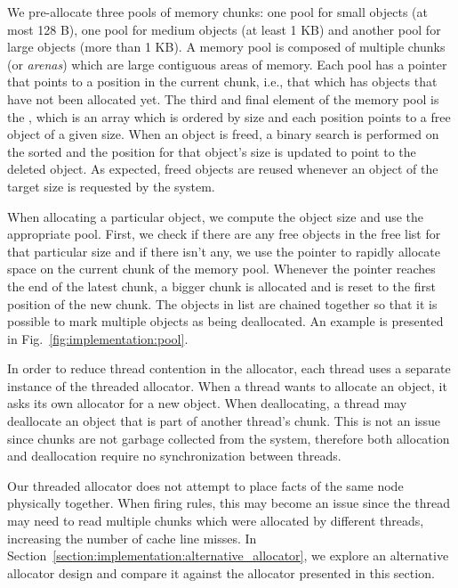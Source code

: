 We pre-allocate three pools of memory chunks: one pool for small objects (at
most 128 B), one pool for medium objects (at least 1 KB) and another pool for
large objects (more than 1 KB).  A memory pool is composed of multiple chunks
(or \emph{arenas}) which are large contiguous areas of memory. Each pool has a
 pointer that points to a position in the current chunk, i.e., that
which has objects that have not been allocated yet. The third and final element
of the memory pool is the , which is an array which is ordered
by size and each position points to a free object of a given size. When an
object is freed, a binary search is performed on the sorted and the position for
that object's size is updated to point to the deleted object. As expected, freed
objects are reused whenever an object of the target size is requested by the
system.

When allocating a particular object, we compute the object size and use the
appropriate pool. First, we check if there are any free objects in the free list
for that particular size and if there isn't any, we use the  pointer
to rapidly allocate space on the current chunk of the memory pool.  Whenever the
 pointer reaches the end of the latest chunk, a bigger chunk is
allocated and  is reset to the first position of the new chunk. The
objects in  list are chained together so that it is possible to mark
multiple objects as being deallocated.  An example is presented in
Fig.~\ref{fig:implementation:pool}.

In order to reduce thread contention in the allocator, each thread uses a
separate instance of the threaded allocator. When a thread wants to allocate an
object, it asks its own allocator for a new object. When deallocating, a thread
may deallocate an object that is part of another thread's chunk. This is not an
issue since chunks are not garbage collected from the system, therefore both
allocation and deallocation require no synchronization between threads.

Our threaded allocator does not attempt to place facts of the same node
physically together. When firing rules, this may become an issue since the
thread may need to read multiple chunks which were allocated by different
threads, increasing the number of cache line misses. In
Section~\ref{section:implementation:alternative_allocator}, we explore an
alternative allocator design and compare it against the allocator presented in
this section.
